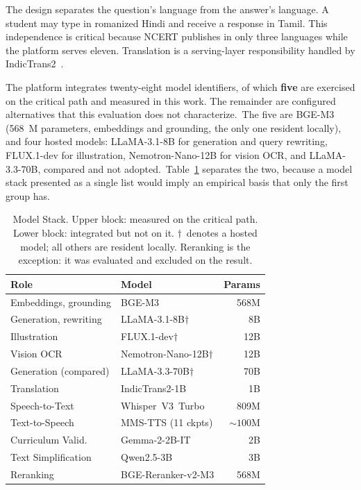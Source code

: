 \ifshort\else  %
The design separates the question's language from the answer's language. A student may type in romanized Hindi and receive a response in Tamil. This independence is critical because NCERT publishes in only three languages while the platform serves eleven. Translation is a serving-layer responsibility handled by IndicTrans2~\cite{b7}.
\fi

\label{sec:models}
The platform integrates twenty-eight model identifiers, of which \textbf{five} are exercised on the critical path and measured in this work. The remainder are configured alternatives that this evaluation does not characterize.\ifshort\ The five are BGE-M3 (568~M parameters, embeddings and grounding, the only one resident locally), and four hosted models: LLaMA-3.1-8B for generation and query rewriting, FLUX.1-dev for illustration, Nemotron-Nano-12B for vision OCR, and LLaMA-3.3-70B, compared and not adopted.\else\ Table~\ref{tab:models} separates the two, because a model stack presented as a single list would imply an empirical basis that only the first group has.\fi

\ifshort\else  %
\begin{table}
\caption{Model Stack. Upper block: measured on the critical path. Lower block: integrated but not on it. $\dagger$~denotes a hosted model; all others are resident locally. Reranking is the exception: it was evaluated and excluded on the result.}
\label{tab:models}
\centering
\footnotesize
\begin{tabular}{@{}llr@{}}
\toprule
\textbf{Role} & \textbf{Model} & \textbf{Params} \\
\midrule
Embeddings, grounding & BGE-M3 & 568M \\
Generation, rewriting & LLaMA-3.1-8B$\dagger$ & 8B \\
Illustration & FLUX.1-dev$\dagger$ & 12B \\
Vision OCR & Nemotron-Nano-12B$\dagger$ & 12B \\
Generation (compared) & LLaMA-3.3-70B$\dagger$ & 70B \\
\midrule
Translation & IndicTrans2-1B & 1B \\
Speech-to-Text & Whisper~V3~Turbo~\cite{b23} & 809M \\
Text-to-Speech & MMS-TTS (11 ckpts) & ${\sim}100$M \\
Curriculum Valid. & Gemma-2-2B-IT & 2B \\
Text Simplification & Qwen2.5-3B & 3B \\
Reranking & BGE-Reranker-v2-M3 & 568M \\
\bottomrule
\end{tabular}
\end{table}
\fi

